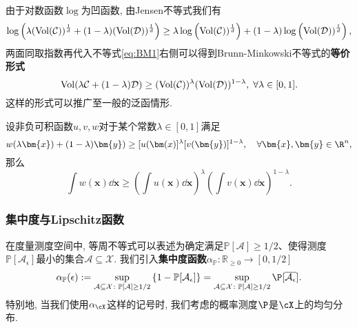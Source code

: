 由于对数函数$\log$为凹函数, 由Jensen不等式我们有
\begin{equation*}
	\log \left( \lambda (\operatorname{Vol}(\mathcal{C}))^{\frac1d} + (1-\lambda) (\operatorname{Vol}(\mathcal{D}))^{\frac1d} \right)
	\geq \lambda \log \left( \operatorname{Vol}(\mathcal{C}))^{\frac1d} \right) + (1-\lambda) \log \left( \operatorname{Vol}(\mathcal{D}))^{\frac1d} \right), 
\end{equation*}
两面同取指数再代入不等式\eqref{eq:BM1}右侧可以得到Brunn-Minkowski不等式的\textbf{等价形式}
\begin{equation}\label{eq:BM2}
	\operatorname{Vol}(\lambda \mathcal{C} + (1-\lambda) \mathcal{D})  
	\geq (\operatorname{Vol}(\mathcal{C}))^{\lambda} (\operatorname{Vol}(\mathcal{D}))^{1-\lambda},\;
	\forall \lambda \in [0,1].
\end{equation}
这样的形式可以推广至一般的泛函情形.
\begin{theorem}\label{thm:Prékopa-LeindlerIneq}
	设非负可积函数$u,v,w$对于某个常数$\lambda \in [0,1]$满足
	\begin{equation}\label{eq:Prékopa-LeindlerCondition}
		w(\lambda \bm{x}) + (1-\lambda) \bm{y})
		\geq [u(\bm(x)]^{\lambda} [v(\bm{y})]^{1-\lambda},
		\quad \forall \bm{x}, \bm{y} \in \R^n, 
	\end{equation}
	那么
	\begin{equation}\label{eq:Prékopa-Leindler}
		\int w(\bm{x}) \dd \bm{x}
		\geq \left( \int u(\bm{x}) \dd \bm{x} \right)^{\lambda} \left( \int v(\bm{x}) \dd \bm{x} \right)^{1-\lambda}. 
	\end{equation}
\end{theorem}


\subsubsection{集中度与Lipschitz函数}

在度量测度空间中, 等周不等式可以表述为确定满足$\mathbb{P}[\mathcal{A}] \geq 1/2$、使得测度$\mathbb{P}[\mathcal{A}_{\epsilon}]$最小的集合$\mathcal{A} \subseteq \mathcal{X}$.
我们引入\textbf{集中度函数}$\alpha_{\mathbb{P}} \colon \mathbb{R}_{\geq 0} \to [0, 1/2]$
\begin{equation*}
	\alpha_{\mathbb{P}}(\epsilon)
	:= \sup_{\mathcal{A} \subseteq \mathcal{X} \colon \mathbb{P}[\mathcal{A}] \geq 1/2} \left\{ 1 - \mathbb{P}[\mathcal{A}_{\epsilon}] \right\}
	= \sup_{\mathcal{A} \subseteq \mathcal{X} \colon \mathbb{P}[\mathcal{A}] \geq 1/2} \P[ \overline{\mathcal{A}_{\epsilon}} ]. 
\end{equation*}
特别地, 当我们使用$\alpha_{\cX}$这样的记号时, 我们考虑的概率测度$\P$是$\cX$上的均匀分布. 

